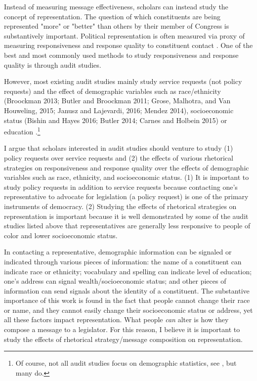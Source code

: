 \documentclass[12pt]{article}\usepackage[]{graphicx}\usepackage[]{color}
\begin{document}
Instead of measuring message effectiveness, scholars can instead study the concept of representation. The question of which constituents are being represented "more" or "better" than others by their member of Congress is substantively important. Political representation is often measured via proxy of measuring responsiveness and response quality to constituent contact \citep{Butler:2011ac, dahl1956preface,Verba:2003aa}. One of the best and most commonly used methods to study responsiveness and response quality is through audit studies.

However, most existing audit studies mainly study service requests (not policy requests) and the effect of demographic variables such as race/ethnicity (Broockman 2013; Butler and Broockman 2011; Grose, Malhotra, and Van Houweling, 2015; Janusz and Lajevardi, 2016; Mendez 2014), socioeconomic status (Bishin and Hayes 2016; Butler 2014; Carnes and Holbein 2015) or education \cite{Neiman2017impact}.\footnote{Of course, not all audit studies focus on demographic statistics, see \cite{Grose:2015aa,Costa:2017aa}, but many do.} 

I argue that scholars interested in audit studies should venture to study (1) policy requests over service requests and (2) the effects of various rhetorical strategies on responsiveness and response quality over the effects of demographic variables such as race, ethnicity, and socioeconomic status. (1) It is important to study policy requests in addition to service requests because contacting one's representative to advocate for legislation (a policy request) is one of the primary instruments of democracy. (2) Studying the effects of rhetorical strategies on representation is important because it is well demonstrated by some of the audit studies listed above that representatives are generally less responsive to people of color and lower socioeconomic status.

 In contacting a representative, demographic information can be signaled or indicated through various pieces of information: the name of a constituent can indicate race or ethnicity; vocabulary and spelling can indicate level of education; one's address can signal wealth/socioeconomic status; and other pieces of information can send signals about the identity of a constituent. The substantive importance of this work is found in the fact that people cannot change their race or name, and they cannot easily change their socioeconomic status or address, yet all these factors impact representation. What people \textit{can} alter is how they compose a message to a legislator. For this reason, I believe it is important to study the effects of rhetorical strategy/message composition on representation.
 
\end{document}
